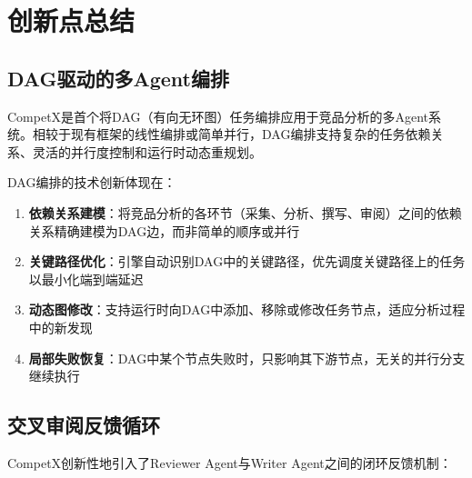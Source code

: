 \documentclass[12pt,a4paper]{ctexrep}
\begin{document}
\chapter{创新点总结}

\section{DAG驱动的多Agent编排}

\begin{innovation}
CompetX是首个将DAG（有向无环图）任务编排应用于竞品分析的多Agent系统。相较于现有框架的线性编排或简单并行，DAG编排支持复杂的任务依赖关系、灵活的并行度控制和运行时动态重规划。
\end{innovation}

DAG编排的技术创新体现在：

\begin{enumerate}[leftmargin=2em]
\item \textbf{依赖关系建模}：将竞品分析的各环节（采集、分析、撰写、审阅）之间的依赖关系精确建模为DAG边，而非简单的顺序或并行
\item \textbf{关键路径优化}：引擎自动识别DAG中的关键路径，优先调度关键路径上的任务以最小化端到端延迟
\item \textbf{动态图修改}：支持运行时向DAG中添加、移除或修改任务节点，适应分析过程中的新发现
\item \textbf{局部失败恢复}：DAG中某个节点失败时，只影响其下游节点，无关的并行分支继续执行
\end{enumerate}

\section{交叉审阅反馈循环}

CompetX创新性地引入了Reviewer Agent与Writer Agent之间的闭环反馈机制：
\end{document}
